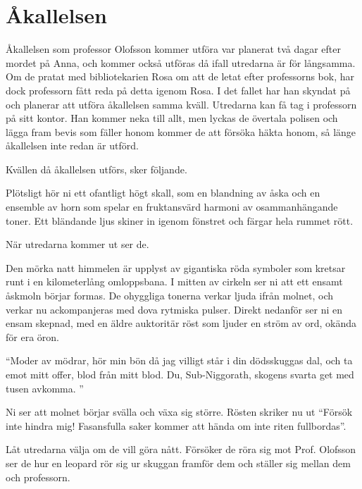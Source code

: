 \section{Åkallelsen}
\label{sek:Akallelsen}
Åkallelsen som professor Olofsson kommer utföra var planerat två dagar efter mordet på Anna, och kommer också utföras då ifall utredarna är för långsamma. Om de pratat med bibliotekarien Rosa om att de letat efter professorns bok, har dock professorn fått reda på detta igenom Rosa. I det fallet har han skyndat på och planerar att utföra åkallelsen samma kväll. Utredarna kan få tag i professorn på sitt kontor. Han kommer neka till allt, men lyckas de övertala polisen och lägga fram bevis som fäller honom kommer de att försöka häkta honom, så länge åkallelsen inte redan är utförd.

Kvällen då åkallelsen utförs, sker följande.
%
\begin{displayquote}
	Plötsligt hör ni ett ofantligt högt skall, som en blandning av åska och en ensemble av horn som spelar en fruktansvärd harmoni av osammanhängande toner. Ett bländande ljus skiner in igenom fönstret och färgar hela rummet rött.
\end{displayquote}
%
När utredarna kommer ut ser de.

\begin{displayquote}
	Den mörka natt himmelen är upplyst av gigantiska röda symboler som kretsar runt i en kilometerlång omloppsbana. I mitten av cirkeln ser ni att ett ensamt åskmoln börjar formas. De ohyggliga tonerna verkar ljuda ifrån molnet, 
	och verkar nu ackompanjeras med dova rytmiska pulser. Direkt nedanför ser ni en ensam skepnad, med en äldre auktoritär röst som ljuder en ström av ord, okända för era öron.
	\begin{center}
		``Moder av mödrar, hör min bön då jag villigt står i din dödsskuggas dal, och ta emot mitt offer, blod från mitt blod. Du, Sub-Niggorath, skogens svarta get med tusen avkomma. ''
	\end{center}
	Ni ser att molnet börjar svälla och växa sig större. Rösten skriker nu ut ``Försök inte hindra mig! Fasansfulla saker kommer att hända om inte riten fullbordas''.
\end{displayquote}
%
Låt utredarna välja om de vill göra nått. Försöker de röra sig mot Prof. Olofsson ser de hur en leopard \sectiondescribe{\ref{var:Leopard}} rör sig ur skuggan framför dem och ställer sig mellan dem och professorn.

